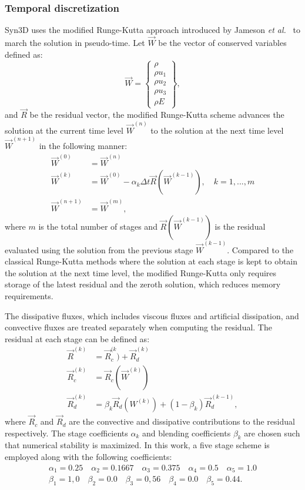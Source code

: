 \subsubsection{Temporal discretization}
%
Syn3D uses the modified Runge-Kutta approach introduced by Jameson \textit{et al.}~\cite{jameson1981numerical} to march the solution in pseudo-time. Let $\vec{W}$ be the vector of conserved variables defined as:
\begin{equation}
    \vec{W} = 
    \begin{Bmatrix}
        \rho \\
        \rho u_1 \\
        \rho u_2 \\
        \rho u_3 \\
        \rho E
    \end{Bmatrix}
    \label{eq:wstate},
\end{equation}
and $\vec{R}$ be the residual vector, the modified Runge-Kutta scheme advances the solution at the current time level $\vec{W}^{(n)}$ to the solution at the next time level $\vec{W}^{(n+1)}$ in the following manner:
\begin{align*}
    \vec{W}^{(0)} &= \vec{W}^{(n)} \\
    \vec{W}^{(k)} &= \vec{W}^{(0)} - \alpha_k \Delta t \vec{R}(\vec{W}^{(k-1)}), 
        \quad k=1,...,m \\
    \vec{W}^{(n+1)} &= \vec{W}^{(m)},
\end{align*}
where $m$ is the total number of stages and $\vec{R}(\vec{W}^{(k-1)})$ is the residual evaluated using the solution from the previous stage $\vec{W}^{(k-1)}$. Compared to the classical Runge-Kutta methods where the solution at each stage is kept to obtain the solution at the next time level, the modified Runge-Kutta only requires storage of the latest residual and the zeroth solution, which reduces memory requirements. 

The dissipative fluxes, which includes viscous fluxes and artificial dissipation, and convective fluxes are treated separately when computing the residual. The residual at each stage can be defined as:
\begin{align*}
    \vec{R}^{(k)} &= \vec{R}_{c}^{(k}) + \vec{R}_{d}^{(k)} \\
    \vec{R}_c^{(k)} &= \vec{R}_c(\vec{W}^{(k)}) \\
    \vec{R}_d^{(k)} &= \beta_k \vec{R}_d(W^{(k)}) + (1 - \beta_k)\vec{R}_d^{(k-1)},
\end{align*}
where $\vec{R}_c$ and $\vec{R}_d$ are the convective and dissipative contributions to the residual respectively. The stage coefficients $\alpha_k$ and blending coefficients $\beta_k$ are chosen such that numerical stability is maximized. In this work, a five stage scheme is employed along with the following coefficients:
\begin{align*}
    \alpha_1 = 0.25 \quad \alpha_2 = 0.1667 \quad \alpha_3 = 0.375
        \quad \alpha_4=0.5 \quad \alpha_5 = 1.0 \\
    \beta_1 = 1,0 \quad \beta_2 = 0.0 \quad \beta_3 = 0,56 
        \quad \beta_4 = 0.0 \quad \beta_5 = 0.44.
\end{align*}
%
